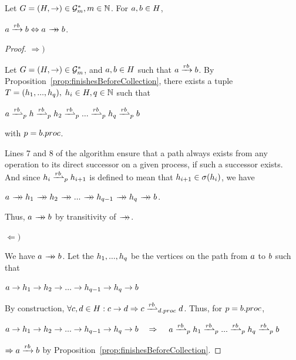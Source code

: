 \begin{proposition}
Let $G=(H,\rightarrow)\in\mathcal{G}^*_m,m\in\mathbb{N}$. For \mbox{$a,b \in H$},
\begin{center}
$\opa\rb\opb \Leftrightarrow \opa\patharrow\opb$.
\end{center}
\end{proposition}
\begin{proof}\slshape
$\Rightarrow)$

Let $G=(H,\rightarrow)\in\mathcal{G}^*_m$, and $a,b \in H$ such that $a\xrightarrow{rb}b$. By Proposition~\ref{prop:finishesBeforeCollection}, there exists a tuple \mbox{$T=(h_1,...,h_q),\; h_i \in H, q\in\mathbb{N}$} such that 
\begin{center}
\mbox{$\opa\dsucp{p} \oph \dsucp{p} \oph_2 \dsucp{p} ... \dsucp{p} \oph_q \dsucp{p} \opb$}

\end{center}
with  $p=b.proc$. 

Lines 7 and 8 of the algorithm ensure that a path always exists from any operation to its direct successor on a given process, if such a successor exists. And since $\oph_i \dsucp{p} \oph_{i+1}$  is defined to mean that  $h_{i+1}\in\sigma(h_i)$, we have

\begin{center}
$\opa \patharrow \oph_1 \patharrow \oph_2 \patharrow ... \patharrow \oph_{q-1} \patharrow \oph_q \patharrow \opb$.
\end{center}

Thus, $\opa\patharrow\opb$ by transitivity of $\patharrow$.


$\Leftarrow)$

We have $\opa\patharrow\opb$. Let the $h_1,...,h_q$ be the vertices on the path from $a$ to $b$ such that

\begin{center}
$
a \rightarrow h_1 \rightarrow h_2 \rightarrow ... \rightarrow h_{q-1} \rightarrow h_q \rightarrow b
$
\end{center}


By construction, $\forall \opc,\opd\in H:\opc\rightarrow\opd\Rightarrow \opc\dsucp{\opd.proc}\opd$. Thus, for $p=b.proc$,

\begin{center}
$
a \rightarrow h_1 \rightarrow h_2 \rightarrow ... \rightarrow h_{q-1} \rightarrow h_q \rightarrow b
 \quad\Rightarrow\quad$
\mbox{$\opa \dsucp{p} \oph_1 \dsucp{p} ... \dsucp{p} \oph_q \dsucp{p} \opb$} 
\end{center}

$\Rightarrow a \xrightarrow{rb} b$ by Proposition~\ref{prop:finishesBeforeCollection}.
\end{proof}

